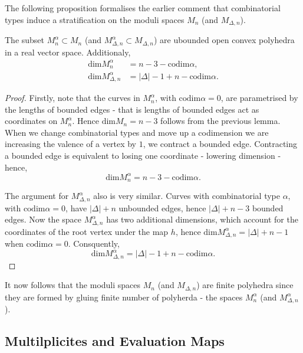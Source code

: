 The following proposition formalises the earlier comment that combinatorial types induce a stratification on the moduli spaces $M_{n}$ (and $M_{\Delta, n}$).

\begin{proposition}
    The subset $M^{\alpha}_{n} \subset M_{n}$ (and $M^{\alpha}_{\Delta,n} \subset M_{\Delta,n}$) are ubounded open convex polyhedra in a real vector space. 
    Additionaly,
    \begin{align*}
        \text{dim}M_{n}^{\alpha} &= n-3-\text{codim}\alpha,\\
        \text{dim}M^{\alpha}_{\Delta, n} &= |\Delta| - 1 + n - \text{codim}\alpha.
    \end{align*}
\end{proposition}
\begin{proof}
    Firstly, note that the curves in $M^{\alpha}_{n}$, with $\text{codim}\alpha = 0$, are parametrised by the lengths of bounded edges - that is lengths of bounded edges act as coordinates on $M^{\alpha}_{n}$.
    Hence $\text{dim}M_{n} = n-3$ follows from the previous lemma.
    When we change combinatorial types and move up a codimension we are increasing the valence of a vertex by $1$, we contract a bounded edge.
    Contracting a bounded edge is equivalent to losing one coordinate - lowering dimension - hence,
    \[
        \text{dim}M_{n}^{\alpha} = n-3-\text{codim}\alpha.
    \]
    \par The argument for $M^{\alpha}_{\Delta,n}$ also is very similar.
    Curves with combinatorial type $\alpha$, with $\text{codim}\alpha = 0$, have $|\Delta|+n$ unbounded edges, hence $|\Delta| + n - 3$ bounded edges.
    Now the space $M^{\alpha}_{\Delta,n}$ has two additional dimensions, which account for the coordinates of the root vertex under the map $h$, hence $\text{dim}M^{\alpha}_{\Delta,n} = |\Delta| + n - 1$ when $\text{codim}\alpha = 0$.
    Consquently,
    \[
        \text{dim}M^{\alpha}_{\Delta, n} = |\Delta| - 1 + n - \text{codim}\alpha.
    \]
\end{proof}

\begin{remark}    
    It now follows that the moduli spaces $M_{n}$ (and $M_{\Delta, n}$) are finite polyhedra since they are formed by gluing finite number of polyherda - the spaces $M^{\alpha}_{n}$ (and $M_{\Delta,n}^{\alpha}$). 
\end{remark}

\subsection{Multilplicites and Evaluation Maps}

